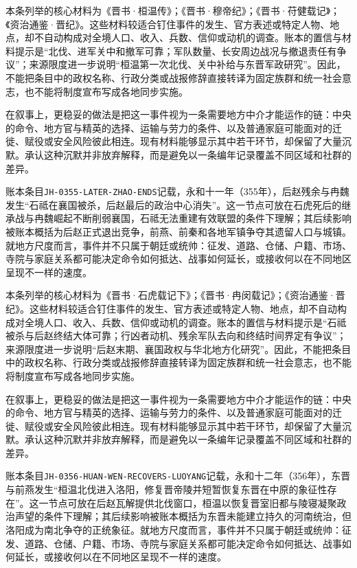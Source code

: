 本条列举的核心材料为《晋书·桓温传》；《晋书·穆帝纪》；《晋书·苻健载记》；《资治通鉴·晋纪》。这些材料较适合钉住事件的发生、官方表述或特定人物、地点，却不自动构成对全境人口、收入、兵数、信仰或动机的调查。账本的置信与材料提示是“北伐、进军关中和撤军可靠；军队数量、长安周边战况与撤退责任有争议”；来源限度进一步说明“桓温第一次北伐、关中补给与东晋军政研究”。因此，不能把条目中的政权名称、行政分类或战报修辞直接转译为固定族群和统一社会意志，也不能将制度宣布写成各地同步实施。

在叙事上，更稳妥的做法是把这一事件视为一条需要地方中介才能运作的链：中央的命令、地方官与精英的选择、运输与劳力的条件、以及普通家庭可能面对的迁徙、赋役或安全风险彼此相连。现有材料能够显示其中若干环节，却保留了大量沉默。承认这种沉默并非放弃解释，而是避免以一条编年记录覆盖不同区域和社群的差异。

账本条目\texttt{JH-0355-LATER-ZHAO-ENDS}记载，永和十一年（355年），后赵残余与冉魏发生“石祗在襄国被杀，后赵最后的政治中心消失”。这一节点可放在石虎死后的继承战与冉魏崛起不断削弱襄国，石祗无法重建有效联盟的条件下理解；其后续影响被账本概括为后赵正式退出竞争，前燕、前秦和各地军镇争夺其遗留人口与城镇。就地方尺度而言，事件并不只属于朝廷或统帅：征发、道路、仓储、户籍、市场、寺院与家庭关系都可能决定命令如何抵达、战事如何延长，或接收何以在不同地区呈现不一样的速度。

本条列举的核心材料为《晋书·石虎载记下》；《晋书·冉闵载记》；《资治通鉴·晋纪》。这些材料较适合钉住事件的发生、官方表述或特定人物、地点，却不自动构成对全境人口、收入、兵数、信仰或动机的调查。账本的置信与材料提示是“石祗被杀与后赵终结大体可靠；行凶者动机、残余军队去向和终结时间界定有争议”；来源限度进一步说明“后赵末期、襄国政权与华北地方化研究”。因此，不能把条目中的政权名称、行政分类或战报修辞直接转译为固定族群和统一社会意志，也不能将制度宣布写成各地同步实施。

在叙事上，更稳妥的做法是把这一事件视为一条需要地方中介才能运作的链：中央的命令、地方官与精英的选择、运输与劳力的条件、以及普通家庭可能面对的迁徙、赋役或安全风险彼此相连。现有材料能够显示其中若干环节，却保留了大量沉默。承认这种沉默并非放弃解释，而是避免以一条编年记录覆盖不同区域和社群的差异。

账本条目\texttt{JH-0356-HUAN-WEN-RECOVERS-LUOYANG}记载，永和十二年（356年），东晋与前燕发生“桓温北伐进入洛阳，修复晋帝陵并短暂恢复东晋在中原的象征性存在”。这一节点可放在后赵瓦解提供北伐窗口，桓温以恢复晋室旧都与陵寝凝聚政治声望的条件下理解；其后续影响被账本概括为东晋未能建立持久的河南统治，但洛阳成为南北争夺的正统象征。就地方尺度而言，事件并不只属于朝廷或统帅：征发、道路、仓储、户籍、市场、寺院与家庭关系都可能决定命令如何抵达、战事如何延长，或接收何以在不同地区呈现不一样的速度。

